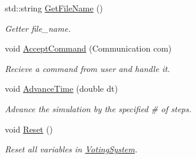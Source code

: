 \begin{DoxyCompactItemize}
\mbox{\label{classVotingSystem_ad7eef413416223230ed36ee1059b02f2}} 
std\+::string \hyperlink{classVotingSystem_ad7eef413416223230ed36ee1059b02f2}{Get\+File\+Name} ()
\begin{DoxyCompactList}\small\item\em Getter file\+\_\+name. \end{DoxyCompactList}\item 
\mbox{\label{classVotingSystem_a06144a45a692d5bb5f1849d7cae438c2}} 
void \hyperlink{classVotingSystem_a06144a45a692d5bb5f1849d7cae438c2}{Accept\+Command} (Communication com)
\begin{DoxyCompactList}\small\item\em Recieve a command from user and handle it. \end{DoxyCompactList}\item 
void \hyperlink{classVotingSystem_a54c0b7c2180d3c158846ecbd61a385ab}{Advance\+Time} (double dt)
\begin{DoxyCompactList}\small\item\em Advance the simulation by the specified \# of steps. \end{DoxyCompactList}\item 
\mbox{\label{classVotingSystem_a59b3f2af814cc5da9f7b9554c06896e9}} 
void \hyperlink{classVotingSystem_a59b3f2af814cc5da9f7b9554c06896e9}{Reset} ()
\begin{DoxyCompactList}\small\item\em Reset all variables in \hyperlink{classVotingSystem}{Voting\+System}. \end{DoxyCompactList}\end{DoxyCompactItemize}
